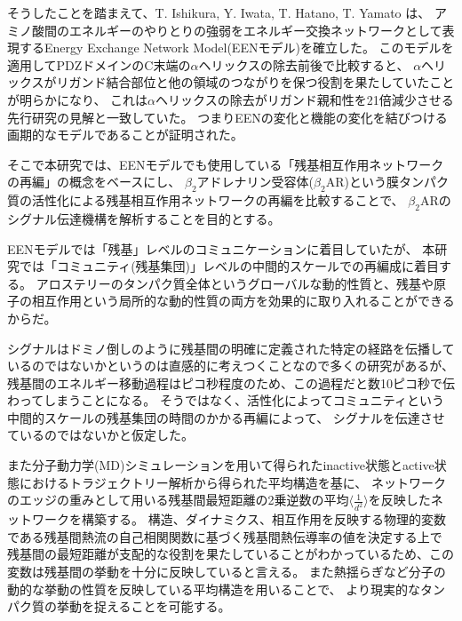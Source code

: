 そうしたことを踏まえて、T. Ishikura, Y. Iwata, T. Hatano, T. Yamato は、
アミノ酸間のエネルギーのやりとりの強弱をエネルギー交換ネットワークとして表現するEnergy Exchange Network Model(EENモデル)を確立\cite{Ishikura2015}した。
このモデルを適用してPDZドメインのC末端の$\alpha$ヘリックスの除去前後で比較すると、
$\alpha$ヘリックスがリガンド結合部位と他の領域のつながりを保つ役割を果たしていたことが明らかになり、
これは$\alpha$ヘリックスの除去がリガンド親和性を21倍減少させる先行研究の見解と一致していた。
つまりEENの変化と機能の変化を結びつける画期的なモデルであることが証明された。


そこで本研究では、EENモデルでも使用している「残基相互作用ネットワークの再編」の概念をベースにし、
$\beta_2$アドレナリン受容体($\beta_2$AR)という膜タンパク質の活性化による残基相互作用ネットワークの再編を比較することで、
$\beta_2$ARのシグナル伝達機構を解析することを目的とする。

EENモデルでは「残基」レベルのコミュニケーションに着目していたが、
本研究では「コミュニティ(残基集団)」レベルの中間的スケールでの再編成に着目する。
アロステリーのタンパク質全体というグローバルな動的性質と、残基や原子の相互作用という局所的な動的性質の両方を効果的に取り入れることができるからだ。

シグナルはドミノ倒しのように残基間の明確に定義された特定の経路を伝播しているのではないかというのは直感的に考えつくことなので多くの研究があるが、
残基間のエネルギー移動過程はピコ秒程度のため、この過程だと数10ピコ秒で伝わってしまうことになる。
そうではなく、活性化によってコミュニティという中間的スケールの残基集団の時間のかかる再編によって、
シグナルを伝達させているのではないかと仮定した。

また分子動力学(MD)シミュレーションを用いて得られたinactive状態とactive状態におけるトラジェクトリー解析から得られた平均構造を基に、
ネットワークのエッジの重みとして用いる残基間最短距離の2乗逆数の平均$\langle \frac{1}{d^2} \rangle$を反映したネットワークを構築する。
構造、ダイナミクス、相互作用を反映する物理的変数である残基間熱流の自己相関関数に基づく残基間熱伝導率の値を決定する上で
残基間の最短距離が支配的な役割を果たしていることがわかっている\cite{Wang2024}ため、この変数は残基間の挙動を十分に反映していると言える。
また熱揺らぎなど分子の動的な挙動の性質を反映している平均構造を用いることで、
より現実的なタンパク質の挙動を捉えることを可能する。

